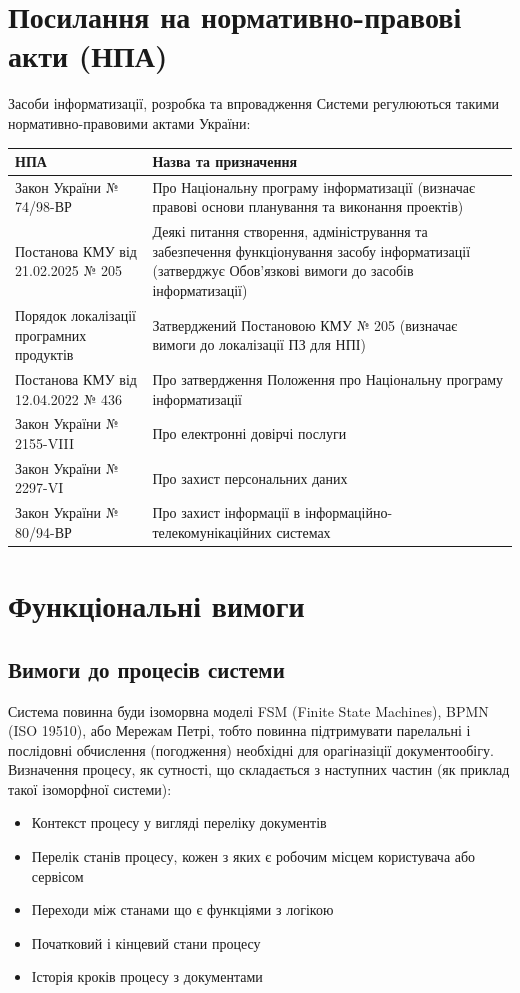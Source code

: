 \documentclass{article}
\begin{document}
\newpage
\section{Посилання на нормативно-правові акти (НПА)}

Засоби інформатизації, розробка та впровадження Системи регулюються такими нормативно-правовими актами України:

\begin{longtable}{p{4cm}p{9cm}}
\toprule
\textbf{НПА} & \textbf{Назва та призначення} \\
\midrule
Закон України № 74/98-ВР & Про Національну програму інформатизації (визначає правові основи планування та виконання проектів) \\
Постанова КМУ від 21.02.2025 № 205 & Деякі питання створення, адміністрування та забезпечення функціонування засобу інформатизації (затверджує Обов'язкові вимоги до засобів інформатизації) \\
Порядок локалізації програмних продуктів & Затверджений Постановою КМУ № 205 (визначає вимоги до локалізації ПЗ для НПІ) \\
Постанова КМУ від 12.04.2022 № 436 & Про затвердження Положення про Національну програму інформатизації \\
Закон України № 2155-VIII & Про електронні довірчі послуги \\
Закон України № 2297-VI & Про захист персональних даних \\
Закон України № 80/94-ВР & Про захист інформації в інформаційно-телекомунікаційних системах \\
\bottomrule
\end{longtable}

\newpage
\section{Функціональні вимоги}

\subsection{Вимоги до процесів системи}
Система повинна буди ізоморвна моделі FSM (Finite State Machines), BPMN (ISO 19510), або Мережам Петрі,
тобто повинна підтримувати парелальні і послідовні обчислення (погодження) необхідні для орагіназіції
документообігу. Визначення процесу, як сутності, що складається з наступних частин (як приклад такої ізоморфної системи):

\begin{itemize}
    \item Контекст процесу у вигляді переліку документів
    \item Перелік станів процесу, кожен з яких є робочим місцем користувача або сервісом
    \item Переходи між станами що є функціями з логікою
    \item Початковий і кінцевий стани процесу
    \item Історія кроків процесу з документами
\end{itemize}
\end{document}
